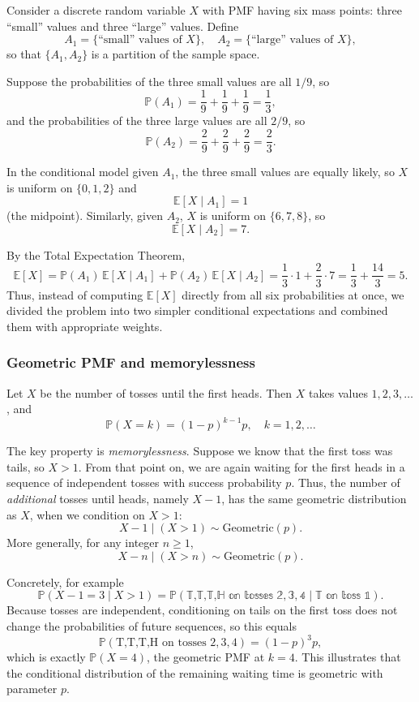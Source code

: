 Consider a discrete random variable \(X\) with PMF having six mass points: three “small” values and three “large” values.  
Define
\[
A_1 = \{\text{“small” values of } X\}, \quad
A_2 = \{\text{“large” values of } X\},
\]
so that \(\{A_1,A_2\}\) is a partition of the sample space.

Suppose the probabilities of the three small values are all \(1/9\), so
\[
\mathbb{P}(A_1) = \frac{1}{9} + \frac{1}{9} + \frac{1}{9} = \frac{1}{3},
\]
and the probabilities of the three large values are all \(2/9\), so
\[
\mathbb{P}(A_2) = \frac{2}{9} + \frac{2}{9} + \frac{2}{9} = \frac{2}{3}.
\]

In the conditional model given \(A_1\), the three small values are equally likely, so \(X\) is uniform on \(\{0,1,2\}\) and
\[
\mathbb{E}[X \mid A_1] = 1
\]
(the midpoint).  
Similarly, given \(A_2\), \(X\) is uniform on \(\{6,7,8\}\), so
\[
\mathbb{E}[X \mid A_2] = 7.
\]

By the Total Expectation Theorem,
\[
\mathbb{E}[X]
= \mathbb{P}(A_1)\,\mathbb{E}[X \mid A_1]
+ \mathbb{P}(A_2)\,\mathbb{E}[X \mid A_2]
= \frac{1}{3} \cdot 1 + \frac{2}{3} \cdot 7
= \frac{1}{3} + \frac{14}{3}
= 5.
\]
Thus, instead of computing \(\mathbb{E}[X]\) directly from all six probabilities at once, we divided the problem into two simpler conditional expectations and combined them with appropriate weights.



\subsubsection{Geometric PMF and memorylessness}

Let \(X\) be the number of tosses until the first heads.  
Then \(X\) takes values \(1,2,3,\dots\), and
\[
\mathbb{P}(X = k) = (1-p)^{k-1} p, \quad k = 1,2,\dots
\]

The key property is \textit{memorylessness}.  
Suppose we know that the first toss was tails, so \(X > 1\).  
From that point on, we are again waiting for the first heads in a sequence of independent tosses with success probability \(p\).  
Thus, the number of \textit{additional} tosses until heads, namely \(X-1\), has the same geometric distribution as \(X\), when we condition on \(X>1\):
\[
X-1 \mid (X>1) \sim \text{Geometric}(p).
\]
More generally, for any integer \(n \ge 1\),
\[
X-n \mid (X>n) \sim \text{Geometric}(p).
\]

Concretely, for example
\[
\mathbb{P}(X-1 = 3 \mid X>1)
= \mathbb{P(\text{T,T,T,H on tosses }2,3,4 \mid \text{T on toss }1)}.
\]
Because tosses are independent, conditioning on tails on the first toss does not change the probabilities of future sequences, so this equals
\[
\mathbb{P}(\text{T,T,T,H on tosses }2,3,4)
= (1-p)^3 p,
\]
which is exactly \(\mathbb{P}(X = 4)\), the geometric PMF at \(k=4\).  
This illustrates that the conditional distribution of the remaining waiting time is geometric with parameter \(p\).

